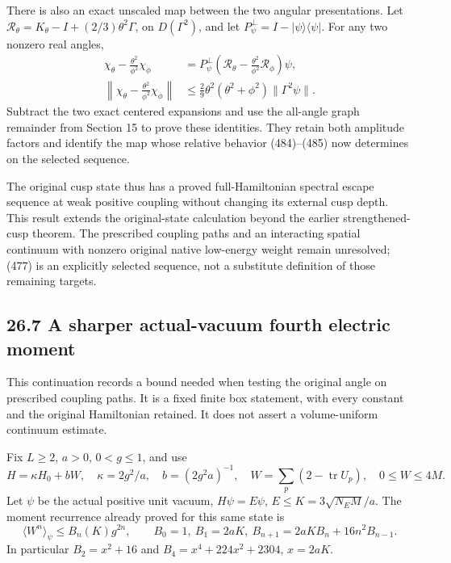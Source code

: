 \documentclass[
  11pt,
]{article}
\begin{document}
There is also an exact unscaled map between the two angular
presentations. Let \(\mathcal R_\theta=K_\theta-I+(2/3)\theta^2\Gamma\),
on \(D(\Gamma^2)\), and let \(P_\psi^\perp=I-|\psi\rangle\langle\psi|\).
For any two nonzero real angles, \[
 \begin{split}
 \chi_\theta-\frac{\theta^2}{\phi^2}\chi_\phi
 &=P_\psi^\perp
       \left(\mathcal R_\theta-\frac{\theta^2}{\phi^2}
                       \mathcal R_\phi\right)\psi,\\
 \left\|\chi_\theta-\frac{\theta^2}{\phi^2}\chi_\phi\right\|
 &\le\frac29\theta^2(\theta^2+\phi^2)\|\Gamma^2\psi\|.
 \end{split}\tag{486}
\] Subtract the two exact centered expansions and use the all-angle
graph remainder from Section 15 to prove these identities. They retain
both amplitude factors and identify the map whose relative behavior
(484)--(485) now determines on the selected sequence.

The original cusp state thus has a proved full-Hamiltonian spectral
escape sequence at weak positive coupling without changing its external
cusp depth. This result extends the original-state calculation beyond
the earlier strengthened-cusp theorem. The prescribed coupling paths and
an interacting spatial continuum with nonzero original native low-energy
weight remain unresolved; (477) is an explicitly selected sequence, not
a substitute definition of those remaining targets.

\subsection{26.7 A sharper actual-vacuum fourth electric
moment}\label{a-sharper-actual-vacuum-fourth-electric-moment}

This continuation records a bound needed when testing the original angle
on prescribed coupling paths. It is a fixed finite box statement, with
every constant and the original Hamiltonian retained. It does not assert
a volume-uniform continuum estimate.

Fix \(L\ge2\), \(a>0\), \(0<g\le1\), and use \[
 H=\kappa H_0+bW,\quad \kappa=2g^2/a,\quad b=(2g^2a)^{-1},
\quad W=\sum_p(2-\operatorname{tr}U_p),\quad 0\le W\le4M .
\] Let \(\psi\) be the actual positive unit vacuum, \(H\psi=E\psi\),
\(E\le K=3\sqrt{N_EM}/a\). The moment recurrence already proved for this
same state is \[
 \langle W^n\rangle_\psi\le B_n(K)g^{2n},\qquad
 B_0=1,\ B_1=2aK,\ B_{n+1}=2aK B_n+16n^2B_{n-1}.
 \tag{487}
\] In particular \(B_2=x^2+16\) and \(B_4=x^4+224x^2+2304\), \(x=2aK\).
\end{document}

